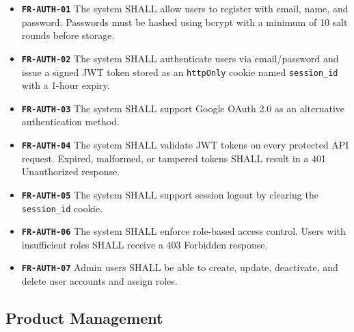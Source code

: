 ﻿\documentclass[12pt,a4paper]{report}
\newcommand{\req}[1]{\texttt{\textbf{\color{primary}#1}}}
\begin{document}
\begin{tcolorbox}[reqbox,title={FR-AUTH: Authentication Requirements}]
\begin{itemize}[leftmargin=1.5em]
  \item \req{FR-AUTH-01} The system SHALL allow users to register with email, name, and password. Passwords must be hashed using bcrypt with a minimum of 10 salt rounds before storage.
  \item \req{FR-AUTH-02} The system SHALL authenticate users via email/password and issue a signed JWT token stored as an \texttt{httpOnly} cookie named \texttt{session\_id} with a 1-hour expiry.
  \item \req{FR-AUTH-03} The system SHALL support Google OAuth 2.0 as an alternative authentication method.
  \item \req{FR-AUTH-04} The system SHALL validate JWT tokens on every protected API request. Expired, malformed, or tampered tokens SHALL result in a 401 Unauthorized response.
  \item \req{FR-AUTH-05} The system SHALL support session logout by clearing the \texttt{session\_id} cookie.
  \item \req{FR-AUTH-06} The system SHALL enforce role-based access control. Users with insufficient roles SHALL receive a 403 Forbidden response.
  \item \req{FR-AUTH-07} Admin users SHALL be able to create, update, deactivate, and delete user accounts and assign roles.
\end{itemize}
\end{tcolorbox}

\subsection{Product Management}
\end{document}
